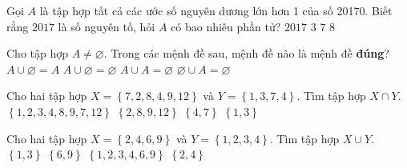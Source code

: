 \begin{ex}%
	Gọi $A$ là tập hợp tất cả các ước số nguyên dương lớn hơn 1 của số 20170. Biết rằng $2017$ là số nguyên tố, hỏi $A$ có bao nhiêu phần tử?
	\choice
	{$2017$}
	{$3$}
	{\True $7$}
	{$8$}
\end{ex}
\begin{ex}%
	Cho tập hợp $A \neq \varnothing$. Trong các mệnh đề sau, mệnh đề nào là mệnh đề \textbf{đúng}?
	\choice
	{\True $A\cup \varnothing = A$}
	{$A\cup \varnothing = \varnothing$}
	{$A\cup A = \varnothing$}
	{$\varnothing \cup A = \varnothing$}
\end{ex}

\begin{ex}%
	Cho hai tập hợp $X=\left\{ 7, 2, 8, 4, 9, 12 \right\}$ và $Y=\left\{ 1, 3, 7, 4 \right\}$. Tìm tập hợp $X\cap Y$.
	\choice
	{$\left\{ 1, 2, 3, 4, 8, 9, 7, 12 \right\}$}
	{$\left\{ 2, 8, 9, 12 \right\}$}
	{\True $\left\{ 4, 7 \right\}$}
	{$\left\{ 1, 3 \right\}$}
\end{ex}

\begin{ex}%
	Cho hai tập hợp $X=\left\{ 2, 4, 6, 9 \right\}$ và $Y=\left\{ 1, 2, 3, 4 \right\}$. Tìm tập hợp $X \cup Y$.
	\choice
	{$\left\{1, 3 \right\}$	}
	{$\left\{6, 9 \right\}$}
	{\True $\left\{1, 2, 3, 4, 6, 9 \right\}$}
	{$\left\{2, 4 \right\}$}
\end{ex}

